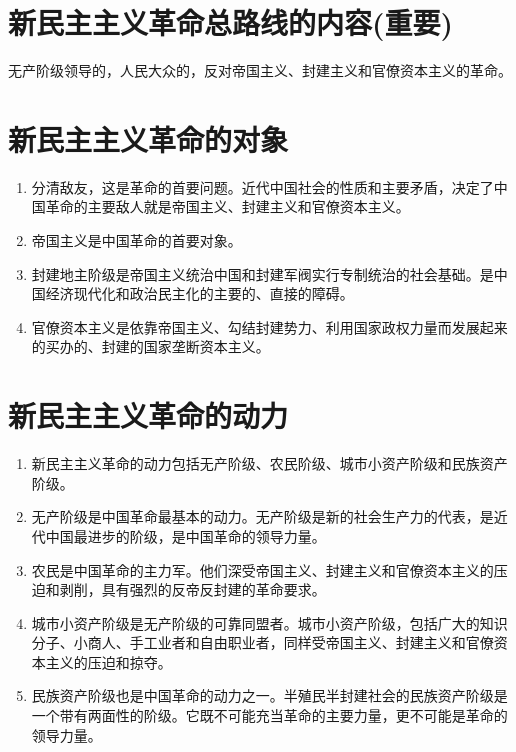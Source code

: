 \documentclass[12pt, a4paper, oneside]{ctexbook}
\begin{document}
\section{新民主主义革命总路线的内容(重要)}

无产阶级领导的，人民大众的，反对帝国主义、封建主义和官僚资本主义的革命。

\section{新民主主义革命的对象}

\begin{enumerate}[label=（\arabic*）]
\item 分清敌友，这是革命的首要问题。近代中国社会的性质和主要矛盾，决定了中国革命的主要敌人就是帝国主义、封建主义和官僚资本主义。

\item 帝国主义是中国革命的首要对象。

\item 封建地主阶级是帝国主义统治中国和封建军阀实行专制统治的社会基础。是中国经济现代化和政治民主化的主要的、直接的障碍。

\item 官僚资本主义是依靠帝国主义、勾结封建势力、利用国家政权力量而发展起来的买办的、封建的国家垄断资本主义。
\end{enumerate}

\section{新民主主义革命的动力}

\begin{enumerate}[label=（\arabic*）]
\item 新民主主义革命的动力包括无产阶级、农民阶级、城市小资产阶级和民族资产阶级。

\item 无产阶级是中国革命最基本的动力。无产阶级是新的社会生产力的代表，是近代中国最进步的阶级，是中国革命的领导力量。

\item 农民是中国革命的主力军。他们深受帝国主义、封建主义和官僚资本主义的压迫和剥削，具有强烈的反帝反封建的革命要求。

\item 城市小资产阶级是无产阶级的可靠同盟者。城市小资产阶级，包括广大的知识分子、小商人、手工业者和自由职业者，同样受帝国主义、封建主义和官僚资本主义的压迫和掠夺。

\item 民族资产阶级也是中国革命的动力之一。半殖民半封建社会的民族资产阶级是一个带有两面性的阶级。它既不可能充当革命的主要力量，更不可能是革命的领导力量。
\end{enumerate}
\end{document}
